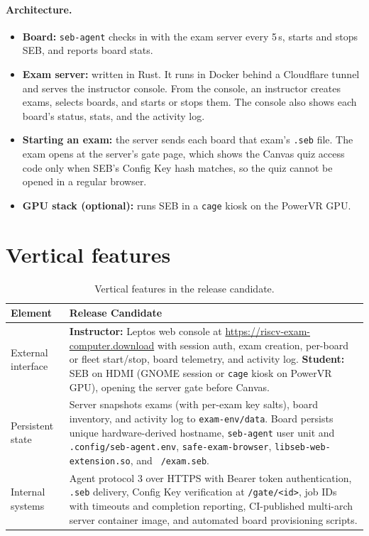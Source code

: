 \documentclass[11pt]{article}
\begin{document}
\paragraph{Architecture.}
\begin{itemize}
  \item \textbf{Board:} \texttt{seb-agent} checks in with the exam server every 5\,s, starts and stops SEB, and reports board stats.
  \item \textbf{Exam server:} written in Rust. It runs in Docker behind a Cloudflare tunnel and serves the instructor console. From the console, an instructor creates exams, selects boards, and starts or stops them. The console also shows each board's status, stats, and the activity log.
  \item \textbf{Starting an exam:} the server sends each board that exam's \texttt{.seb} file. The exam opens at the server's gate page, which shows the Canvas quiz access code only when SEB's Config Key hash matches, so the quiz cannot be opened in a regular browser.
  \item \textbf{GPU stack (optional):} runs SEB in a \texttt{cage} kiosk on the PowerVR GPU.
\end{itemize}

\section{Vertical features}

\begin{table}[H]
  \centering
  \footnotesize
  \setlength{\tabcolsep}{4pt}
  \begin{tabularx}{\textwidth}{@{}p{}X@{}}
    \toprule
    \textbf{Element} & \textbf{Release Candidate} \\
    \midrule
    External interface &
    \textbf{Instructor:} Leptos web console at \url{https://riscv-exam-computer.download} with session auth, exam creation, per-board or fleet start/stop, board telemetry, and activity log. \textbf{Student:} SEB on HDMI (GNOME session or \texttt{cage} kiosk on PowerVR GPU), opening the server gate before Canvas. \\
    Persistent state &
    Server snapshots exams (with per-exam key salts), board inventory, and activity log to \texttt{exam-env/data}. Board persists unique hardware-derived hostname, \texttt{seb-agent} user unit and \texttt{.config/seb-agent.env}, \texttt{safe-exam-browser}, \texttt{libseb-web-extension.so}, and \texttt{~/exam.seb}. \\
    Internal systems &
    Agent protocol 3 over HTTPS with Bearer token authentication, \texttt{.seb} delivery, Config Key verification at \texttt{/gate/<id>}, job IDs with timeouts and completion reporting, CI-published multi-arch server container image, and automated board provisioning scripts. \\
    \bottomrule
  \end{tabularx}
  \caption{Vertical features in the release candidate.}
  \label{tab:vertical}
\end{table}
\end{document}

